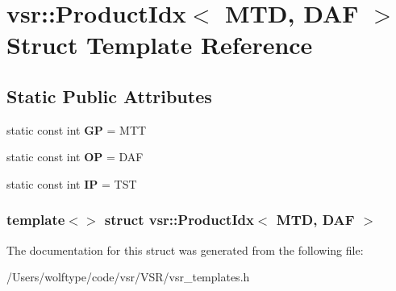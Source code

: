 \hypertarget{structvsr_1_1_product_idx_3_01_m_t_d_00_01_d_a_f_01_4}{\section{vsr\-:\-:Product\-Idx$<$ M\-T\-D, D\-A\-F $>$ Struct Template Reference}
\label{structvsr_1_1_product_idx_3_01_m_t_d_00_01_d_a_f_01_4}
}
\subsection*{Static Public Attributes}
\begin{DoxyCompactItemize}
\item 
\hypertarget{structvsr_1_1_product_idx_3_01_m_t_d_00_01_d_a_f_01_4_aac98e18af412e3d5ea9a312b179c3e56}{static const int {\bfseries G\-P} = M\-T\-T}\label{structvsr_1_1_product_idx_3_01_m_t_d_00_01_d_a_f_01_4_aac98e18af412e3d5ea9a312b179c3e56}

\item 
\hypertarget{structvsr_1_1_product_idx_3_01_m_t_d_00_01_d_a_f_01_4_aad97e87c17f92beeff3ea5230df06c3a}{static const int {\bfseries O\-P} = D\-A\-F}\label{structvsr_1_1_product_idx_3_01_m_t_d_00_01_d_a_f_01_4_aad97e87c17f92beeff3ea5230df06c3a}

\item 
\hypertarget{structvsr_1_1_product_idx_3_01_m_t_d_00_01_d_a_f_01_4_ab3cc2387852aa0e6029a96656128f138}{static const int {\bfseries I\-P} = T\-S\-T}\label{structvsr_1_1_product_idx_3_01_m_t_d_00_01_d_a_f_01_4_ab3cc2387852aa0e6029a96656128f138}

\end{DoxyCompactItemize}
\subsubsection*{template$<$$>$ struct vsr\-::\-Product\-Idx$<$ M\-T\-D, D\-A\-F $>$}



The documentation for this struct was generated from the following file\-:\begin{DoxyCompactItemize}
\item 
/\-Users/wolftype/code/vsr/\-V\-S\-R/vsr\-\_\-templates.\-h\end{DoxyCompactItemize}
